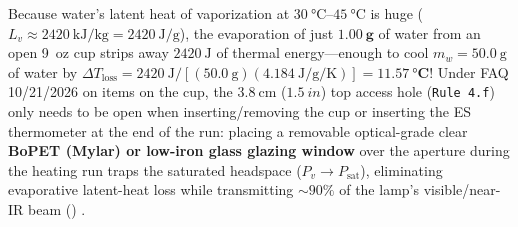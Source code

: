 \begin{devicebox}
Because water's latent heat of vaporization at $\SIrange{30}{45}{\celsius}$ is huge ($L_v \approx \SI{2420}{\kilo\joule\per\kilogram} = \SI{2420}{\joule\per\gram}$), the evaporation of just $\mathbf{\SI{1.00}{\gram}}$ of water from an open 9~oz cup strips away $\SI{2420}{\joule}$ of thermal energy---enough to cool $m_w = \SI{50.0}{\gram}$ of water by $\Delta T_{\mathrm{loss}} = \SI{2420}{\joule}/[(\SI{50.0}{\gram})(\SI{4.184}{\joule\per\gram\per\kelvin})] = \mathbf{\SI{11.57}{\celsius}}$! Under FAQ 10/21/2026 on items on the cup, the $\SI{3.8}{\centi\meter}$ ($\SI{1.5}{in}$) top access hole (\texttt{Rule 4.f}) only needs to be open when inserting/removing the cup or inserting the ES thermometer at the end of the run: placing a removable optical-grade clear \textbf{BoPET (Mylar) or low-iron glass glazing window} over the aperture during the heating run traps the saturated headspace ($P_v \to P_{\mathrm{sat}}$), eliminating evaporative latent-heat loss while transmitting $\sim 90\%$ of the lamp's visible/near-IR beam () .
\end{devicebox}

